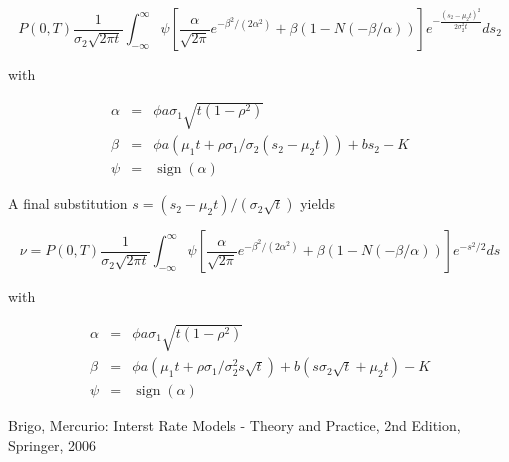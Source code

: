 \documentclass{amsart}
\theoremstyle{plain}
\numberwithin{equation}{section}
\DeclareMathOperator{\sign}{sign}
\begin{document}
\begin{equation}
P(0,T) \frac{1}{\sigma_2\sqrt{2\pi t}} \int_{-\infty}^\infty \psi\left[\frac{\alpha}{\sqrt{2\pi}}e^{-\beta^2/(2\alpha^2)}+\beta(1-N(-\beta/\alpha))\right]e^{-\frac{(s_2-\mu_2t)^2}{2\sigma_2^2 t}} ds_2
\end{equation}

with

\begin{eqnarray}
\alpha &=& \phi a \sigma_1 \sqrt{t(1-\rho^2)} \\
\beta &=& \phi a (\mu_1 t + \rho\sigma_1/\sigma_2(s_2-\mu_2t)) + bs_2 - K \\
\psi &=& \sign(\alpha)
\end{eqnarray}

A final substitution $s = (s_2 - \mu_2t) / (\sigma_2\sqrt{t})$ yields

\begin{equation}
\nu = P(0,T) \frac{1}{\sigma_2\sqrt{2\pi t}} \int_{-\infty}^\infty \psi\left[\frac{\alpha}{\sqrt{2\pi}}e^{-\beta^2/(2\alpha^2)}+\beta(1-N(-\beta/\alpha))\right]e^{-s^2/2} ds
\end{equation}

with

\begin{eqnarray}
\alpha &=& \phi a \sigma_1 \sqrt{t(1-\rho^2)} \\
\beta &=& \phi a (\mu_1 t + \rho\sigma_1/\sigma_2^2s\sqrt{t}) + b(s\sigma_2\sqrt{t}+\mu_2t) - K \\
\psi &=& \sign(\alpha)
\end{eqnarray}


\begin{thebibliography}{1}
Brigo, Mercurio: Interst Rate Models - Theory and Practice, 2nd Edition, Springer, 2006
\end{thebibliography}
\end{document}
